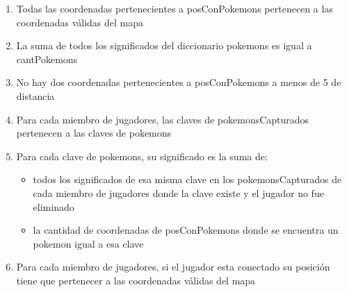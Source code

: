 \begin{Representacion}
\begin{enumerate}
		\item Todas las coordenadas pertenecientes a posConPokemons pertenecen a las coordenadas válidas del mapa

		\item La suma de todos los significados del diccionario pokemons es igual a cantPokemons
		
		\item No hay dos coordenadas pertenecientes a posConPokemons a menos de 5 de distancia
		
		\item Para cada miembro de jugadores, las claves de pokemonsCapturados pertenecen a las claves de pokemons

		\item Para cada clave de pokemons, su significado es la suma de:
		\begin{itemize}
			\item todos los significados de esa misma clave en los pokemonsCapturados de cada miembro de jugadores donde la clave existe y el jugador no fue eliminado
			\item la cantidad de coordenadas de posConPokemons donde se encuentra un pokemon igual a esa clave
		\end{itemize}
		
		\item Para cada miembro de jugadores, si el jugador esta conectado su posición tiene que pertenecer a las coordenadas válidas del mapa
		
	\end{enumerate}


	
	~
	
		

\end{Representacion}
